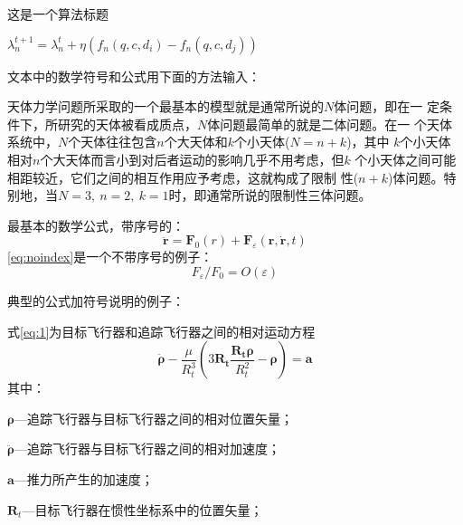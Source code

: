 \begin{minipage}{0.8\textwidth}
\vspace{5mm}
\begin{algorithm}[H]
\caption{这是一个算法标题}

{   
    $\lambda^{t+1}_n = \lambda^t_n + \eta (f_n(q, c, d_i) - f_n(q, c, d_j))$
 }
\end{algorithm}
\end{minipage}


\label{Tricks:Equations}

文本中的数学符号和公式用下面的方法输入：

天体力学问题所采取的一个最基本的模型就是通常所说的$N$体问题，即在一
定条件下，所研究的天体被看成质点，$N$体问题最简单的就是二体问题。在一
个天体系统中，$N$个天体往往包含$n$个大天体和$k$个小天体($N=n+k$)，其中
$k$个小天体相对$n$个大天体而言小到对后者运动的影响几乎不用考虑，但$k$
个小天体之间可能相距较近，它们之间的相互作用应予考虑，这就构成了限制
性($n+k$)体问题。特别地，当$N=3,~n=2,~k=1$时，即通常所说的限制性三体问题。


最基本的数学公式，带序号的：
\begin{equation}
\ddot{\mathbf{r}}=\mathbf{F}_{0}(r)+\mathbf{F}_{\varepsilon}(\mathbf{r},\dot{\mathbf{r}},t)
\end{equation}
\eqref{eq:noindex}是一个不带序号的例子：
\begin{displaymath}\label{eq:noindex}
F_{\varepsilon}/F_{0}=O (\varepsilon)
\end{displaymath}

\FloatBarrier %
典型的公式加符号说明的例子：

式\eqref{eq:1}为目标飞行器和追踪飞行器之间的相对运动方程
\begin{equation}\label{eq:1}
\ddot{\boldsymbol{\rho}}-\frac{\mu}{R_{t}^{3}}\left( 3\mathbf{R_{t}}\frac{\mathbf{R_{t}\rho}}{R_{t}^{2}}-\boldsymbol{\rho}\right)=\mathbf{a}
\end{equation}
其中：

$\boldsymbol{\rho}$---追踪飞行器与目标飞行器之间的相对位置矢量；

$\ddot{\boldsymbol{\rho}}$---追踪飞行器与目标飞行器之间的相对加速度；

$\mathbf{a}$---推力所产生的加速度；

$\mathbf{R}_{t}$---目标飞行器在惯性坐标系中的位置矢量；

